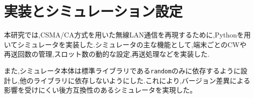 \documentclass[a4paper, 10pt]{ltjsarticle}
\begin{document}
\section{実装とシミュレーション設定}

本研究では,CSMA/CA方式を用いた無線LAN通信を再現するために,Pythonを用いてシミュレータを実装した.シミュレータの主な機能として,端末ごとのCWや再送回数の管理,スロット数の動的な設定,再送処理などを実装した.

また,シミュレータ本体は標準ライブラリである\texttt{random}のみに依存するように設計し,他のライブラリに依存しないようにした.これにより,バージョン差異による影響を受けにくい後方互換性のあるシミュレータを実現した。



\end{document}
